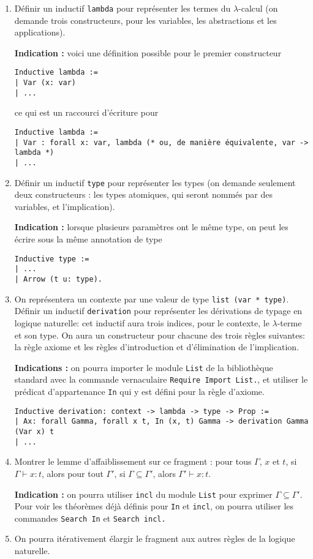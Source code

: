 \documentclass{article}
\begin{document}
\begin{enumerate}
\item Définir un inductif \texttt{lambda} pour représenter les termes du \(\lambda\)-calcul (on demande trois constructeurs, pour les variables, les abstractions et les applications).

\textbf{Indication :} voici une définition possible pour le premier constructeur
\begin{verbatim}
Inductive lambda :=
| Var (x: var)
| ...
\end{verbatim}
ce qui est un raccourci d'écriture pour
\begin{verbatim}
Inductive lambda :=
| Var : forall x: var, lambda (* ou, de manière équivalente, var -> lambda *)
| ...
\end{verbatim}
\item Définir un inductif \texttt{type} pour représenter les types (on demande seulement deux constructeurs : les types atomiques, qui seront nommés par des variables, et l'implication).

\textbf{Indication :} lorsque plusieurs paramètres ont le même type, on peut les écrire sous la même annotation de type
\begin{verbatim}
Inductive type :=
| ...
| Arrow (t u: type).
\end{verbatim}
\item On représentera un contexte par une valeur de type \texttt{list (var * type)}. Définir un inductif \texttt{derivation} pour représenter les dérivations de typage en logique naturelle: cet inductif aura trois indices, pour le contexte, le \(\lambda\)-terme et son type. On aura un constructeur pour chacune des trois règles suivantes: la règle axiome et les règles d'introduction et d'élimination de l'implication.

\textbf{Indications :} on pourra importer le module \texttt{List} de la bibliothèque standard avec la commande vernaculaire \texttt{Require Import List.}, et utiliser le prédicat d'appartenance  \texttt{In} qui y est défini pour la règle d'axiome.
\begin{verbatim}
Inductive derivation: context -> lambda -> type -> Prop :=
| Ax: forall Gamma, forall x t, In (x, t) Gamma -> derivation Gamma (Var x) t
| ...
\end{verbatim}

\item Montrer le lemme d'affaiblissement sur ce fragment : pour tous \(\Gamma\), \(x\) et \(t\), si \(\Gamma \vdash x : t\), alors pour tout \(\Gamma'\), si \(\Gamma \subseteq \Gamma'\), alors \(\Gamma' \vdash x : t\).

\textbf{Indication :} on pourra utiliser \texttt{incl} du module \texttt{List} pour exprimer \(\Gamma \subseteq \Gamma'\).
Pour voir les théorèmes déjà définis pour \texttt{In} et \texttt{incl}, on pourra utiliser les commandes \texttt{Search In} et \texttt{Search incl.} 

\item On pourra itérativement élargir le fragment aux autres règles de la logique naturelle.
\end{enumerate}
\end{document}
